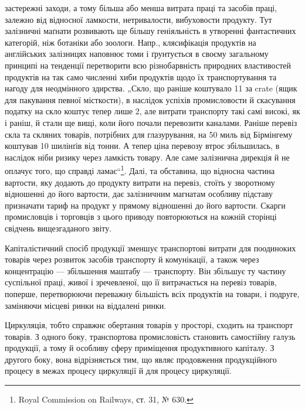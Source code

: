 \parcont{}  %
застережні заходи, а тому більша або менша витрата праці та засобів
праці, залежно від відносної ламкости, нетривалости, вибуховости продукту.
Тут залізничні маґнати розвивають ще більшу геніяльність в утворенні
фантастичних категорій, ніж ботаніки або зоологи. Напр., клясифікація
продуктів на англійських залізницях наповнює томи і ґрунтується
в своєму загальному принципі на тенденції перетворити всю різнобарвність
природних властивостей продуктів на так само численні хиби продуктів
щодо їх транспортування та нагоду для неодмінного здирства.
„Скло, що раніше коштувало 11 за crate (ящик для пакування
певної місткости), в наслідок успіхів промисловости й скасування податку
на скло коштує тепер лише 2, але витрати транспорту такі самі
високі, як і раніш, й стали ще вищі, коли його почали перевозити каналами.
Раніше перевіз скла та скляних товарів, потрібних для глазурування,
на 50 миль від Бірмінгему коштував 10 шилінґів від тонни. А
тепер ціна перевозу втроє збільшилась, в наслідок ніби ризику через
ламкість товару. Але саме залізнична дирекція й не оплачує того, що
справді ламає“\footnote{
Royal Commission on Railways, ст. 31, № 630.
}. Далі, та обставина, що відносна частина вартости, яку
додають до продукту витрати на перевіз, стоїть у зворотному відношенні
до його вартости, дає залізничним магнатам особливу підставу призначати
тариф на продукт у прямому відношенні до його вартости. Скарги промисловців
і торговців з цього приводу повторюються на кожній сторінці
свідчень вищезгаданого звіту.

Капіталістичний спосіб продукції зменшує транспортові витрати для
поодиноких товарів через розвиток засобів транспорту й комунікації, а
також через концентрацію — збільшення маштабу — транспорту. Він збільшує
ту частину суспільної праці, живої і зречевленої, що її витрачається
на перевіз товарів, поперше, перетворюючи переважну більшість всіх
продуктів на товари, і подруге, заміняючи місцеві ринки на віддалені
ринки.

Циркуляція, тобто справжнє обертання товарів у просторі, сходить на
транспорт товарів. З одного боку, транспортова промисловість становить
самостійну галузь продукції, а тому й особливу сферу приміщення продуктивного
капіталу. З другого боку, вона відрізняється тим, що являє
продовження продукційного процесу в межах процесу циркуляції й
для процесу циркуляції.

